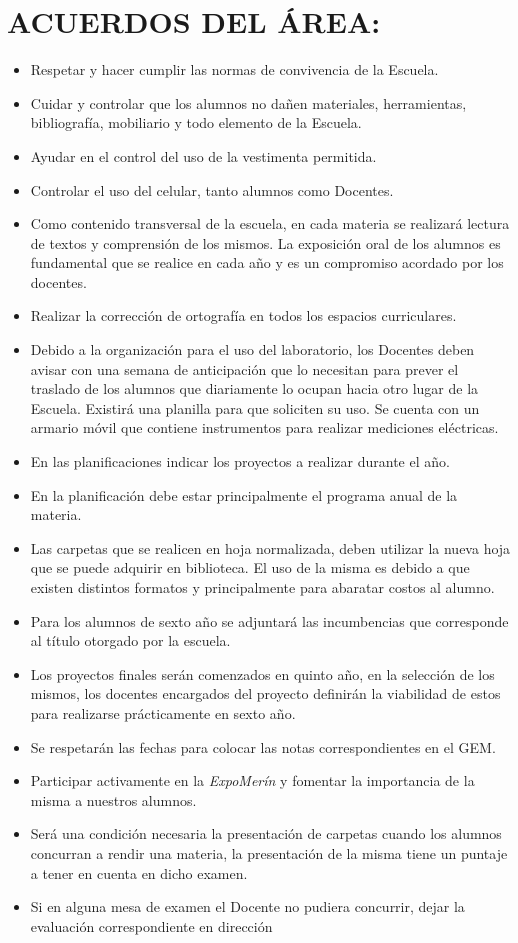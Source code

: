 \documentclass[../main]{subfiles}
\begin{document}
\section{ACUERDOS DEL ÁREA:}

\begin{itemize}
\item Respetar y hacer cumplir las normas de convivencia de la Escuela.
\item Cuidar y controlar que los alumnos no dañen materiales, herramientas, bibliografía,
mobiliario y todo elemento de la Escuela.
\item Ayudar en el control del uso de la vestimenta permitida.
\item Controlar el uso del celular, tanto alumnos como Docentes.
\item Como contenido transversal de la escuela, en cada materia se realizará lectura de
textos y comprensión de los mismos. La exposición oral de los alumnos es fundamental
que se realice en cada año y es un compromiso acordado por los docentes.
\item Realizar la corrección de ortografía en todos los espacios curriculares.
\item Debido a la organización para el uso del laboratorio, los Docentes deben avisar con
una semana de anticipación que lo necesitan para prever el traslado de los alumnos
que diariamente lo ocupan hacia otro lugar de la Escuela. Existirá una planilla para que
soliciten su uso. Se cuenta con un armario móvil que contiene instrumentos para
realizar mediciones eléctricas.
\item En las planificaciones indicar los proyectos a realizar durante el año.
\item En la planificación debe estar principalmente el programa anual de la materia.
\item Las carpetas que se realicen en hoja normalizada, deben utilizar la nueva hoja que se
puede adquirir en biblioteca. El uso de la misma es debido a que existen distintos
formatos y principalmente para abaratar costos al alumno.
\item Para los alumnos de sexto año se adjuntará las incumbencias que corresponde al título
otorgado por la escuela.
\item Los proyectos finales serán comenzados en quinto año, en la selección de los mismos,
los docentes encargados del proyecto definirán la viabilidad de estos para realizarse
prácticamente en sexto año.
\item Se respetarán las fechas para colocar las notas correspondientes en el GEM.
\item Participar activamente en la \emph{ExpoMerín} y fomentar la importancia de la misma a
nuestros alumnos.
\item Será una condición necesaria la presentación de carpetas cuando los alumnos
concurran a rendir una materia, la presentación de la misma tiene un puntaje a tener
en cuenta en dicho examen.
\item Si en alguna mesa de examen el Docente no pudiera concurrir, dejar la evaluación
correspondiente en dirección
\end{itemize}
\end{document}
